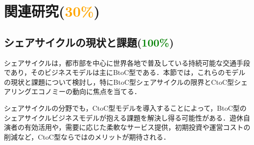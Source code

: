 \section{関連研究(\textcolor{orange}{30\%})}
  \label{sec:関連研究}
    \par
  
  \subsection{シェアサイクルの現状と課題(\textcolor{green}{100\%})}
    \label{sec:シェアサイクルの現状と課題}
      \par シェアサイクルは，都市部を中心に世界各地で普及している持続可能な交通手段であり，そのビジネスモデルは主にBtoC型である．本節では，これらのモデルの現状と課題について検討し，特にBtoC型シェアサイクルの限界とCtoC型シェアリングエコノミーの動向に焦点を当てる．
      \par シェアサイクルの分野でも，CtoC型モデルを導入することによって，BtoC型のシェアサイクルビジネスモデルが抱える課題を解決し得る可能性がある．遊休自演者の有効活用や，需要に応じた柔軟なサービス提供，初期投資や運営コストの削減など，CtoC型ならではのメリットが期待される．
      

